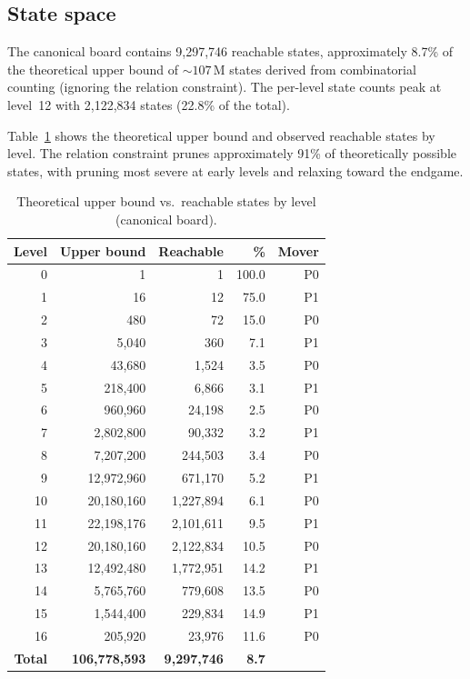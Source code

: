 \documentclass[11pt,a4paper]{article}
\begin{document}
\subsection{State space}

The canonical board contains 9{,}297{,}746 reachable states, approximately
8.7\% of the theoretical upper bound of ${\sim}107$\,M states derived
from combinatorial counting (ignoring the relation constraint).  The
per-level state counts peak at level~12 with 2{,}122{,}834 states (22.8\%
of the total).

Table~\ref{tab:levels} shows the theoretical upper bound and observed
reachable states by level.  The relation constraint prunes approximately
91\% of theoretically possible states, with pruning most severe at early
levels and relaxing toward the endgame.

\begin{table}[t]
\centering
\caption{Theoretical upper bound vs.\ reachable states by level (canonical board).}
\label{tab:levels}
\begin{tabular}{@{}rrrrr@{}}
\toprule
Level & Upper bound & Reachable & \% & Mover\\
\midrule
0  & 1           & 1           & 100.0 & P0\\
1  & 16          & 12          &  75.0 & P1\\
2  & 480         & 72          &  15.0 & P0\\
3  & 5{,}040     & 360         &   7.1 & P1\\
4  & 43{,}680    & 1{,}524     &   3.5 & P0\\
5  & 218{,}400   & 6{,}866     &   3.1 & P1\\
6  & 960{,}960   & 24{,}198    &   2.5 & P0\\
7  & 2{,}802{,}800 & 90{,}332  &   3.2 & P1\\
8  & 7{,}207{,}200 & 244{,}503 &   3.4 & P0\\
9  & 12{,}972{,}960 & 671{,}170 &  5.2 & P1\\
10 & 20{,}180{,}160 & 1{,}227{,}894 & 6.1 & P0\\
11 & 22{,}198{,}176 & 2{,}101{,}611 & 9.5 & P1\\
12 & 20{,}180{,}160 & 2{,}122{,}834 & 10.5 & P0\\
13 & 12{,}492{,}480 & 1{,}772{,}951 & 14.2 & P1\\
14 & 5{,}765{,}760  & 779{,}608    & 13.5 & P0\\
15 & 1{,}544{,}400  & 229{,}834    & 14.9 & P1\\
16 & 205{,}920      & 23{,}976     & 11.6 & P0\\
\midrule
\textbf{Total} & \textbf{106{,}778{,}593} & \textbf{9{,}297{,}746} & \textbf{8.7} &\\
\bottomrule
\end{tabular}
\end{table}
\end{document}
